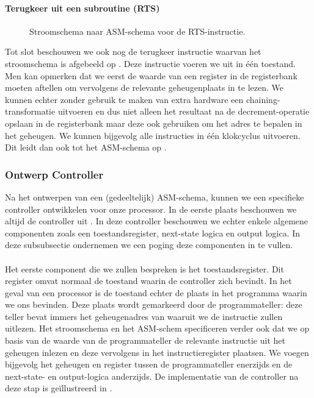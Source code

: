 \paragraph{Terugkeer uit een subroutine (RTS)}
\begin{figure}[hbt]
\centering
{}
\caption{Stroomschema naar ASM-schema voor de RTS-instructie.}
\label{flowasm-rts}
\end{figure}
Tot slot beschouwen we ook nog de terugkeer instructie waarvan het stroomschema is afgebeeld op . Deze instructie voeren we uit in \'e\'en toestand. Men kan opmerken dat we eerst de waarde van een register in de registerbank moeten aftellen om vervolgens de relevante geheugenplaats in te lezen. We kunnen echter zonder gebruik te maken van extra hardware een chaining-transformatie uitvoeren en dus niet alleen het resultaat na de decrement-operatie opslaan in de registerbank maar deze ook gebruiken om het adres te bepalen in het geheugen. We kunnen bijgevolg alle instructies in \'e\'en klokcyclus uitvoeren. Dit leidt dan ook tot het ASM-schema op .
\subsubsection{Ontwerp Controller}
Na het ontwerpen van een (gedeeltelijk) ASM-schema, kunnen we een specifieke controller ontwikkelen voor onze processor. In de eerste plaats beschouwen we altijd de controller uit . In deze controller beschouwen we echter enkele algemene componenten zoals een toestandsregister, next-state logica en output logica. In deze subsubsectie ondernemen we een poging deze componenten in te vullen.
\paragraph{}
Het eerste component die we zullen bespreken is het toestandsregister. Dit register omvat normaal de toestand waarin de controller zich bevindt. In het geval van een processor is de toestand echter de plaats in het programma waarin we ons bevinden. Deze plaats wordt gemarkeerd door de programmateller: deze teller bevat immers het geheugenadres van waaruit we de instructie zullen uitlezen. Het stroomschema en het ASM-schem specificeren verder ook dat we op basis van de waarde van de programmateller de relevante instructie uit het geheugen inlezen en deze vervolgens in het instructieregister plaatsen. We voegen bijgevolg het geheugen en register tussen de programmateller enerzijds en de next-state- en output-logica anderzijds. De implementatie van de controller na deze stap is ge\"illustreerd in .
